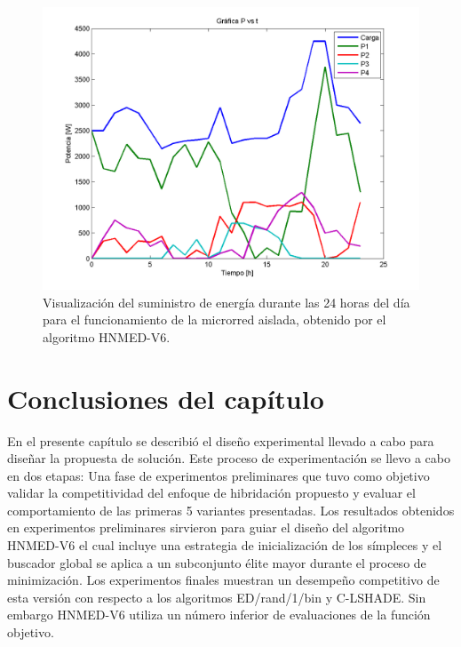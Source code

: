 \begin{figure}
	\centering

		\includegraphics[width=\textwidth]{Figures/SCE1}


	\caption{Visualización del suministro de energía durante las 24 horas del día para el funcionamiento de la microrred aislada, obtenido por el algoritmo HNMED-V6.} \label{Visualización del suministro de energía durante las 24 horas del día para el funcionamiento de la microrred aislada, obtenido por el algoritmo HNMED-V6.}
\end{figure}


\section{Conclusiones del capítulo}
En el presente capítulo se describió el diseño experimental llevado a cabo para diseñar la propuesta de solución. Este proceso de experimentación se llevo a cabo en dos etapas: Una fase de experimentos preliminares que tuvo como objetivo validar la competitividad del enfoque de hibridación propuesto y evaluar el comportamiento de las primeras 5 variantes presentadas. Los resultados obtenidos en experimentos preliminares sirvieron para guiar el diseño del algoritmo HNMED-V6 el cual incluye una estrategia de inicialización de los símpleces y el buscador global se aplica a un subconjunto élite mayor durante el proceso de minimización. Los experimentos finales muestran un desempeño competitivo de esta versión con respecto a los algoritmos ED/rand/1/bin y C-LSHADE. Sin embargo HNMED-V6 utiliza un número inferior de evaluaciones de la función objetivo.